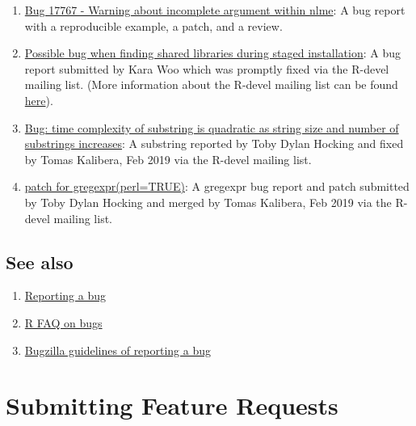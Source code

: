 \documentclass[
  letterpaper,
  DIV=11,
  numbers=noendperiod]{scrreprt}
\begin{document}
\begin{enumerate}
\def\labelenumi{\arabic{enumi}.}
\item
  \href{https://bugs.r-project.org/bugzilla/show_bug.cgi?id=17767}{Bug
  17767 - Warning about incomplete argument within nlme}: A bug report
  with a reproducible example, a patch, and a review.
\item
  \href{https://stat.ethz.ch/pipermail/r-devel/2019-May/077855.html}{Possible
  bug when finding shared libraries during staged installation}: A bug
  report submitted by Kara Woo which was promptly fixed via the R-devel
  mailing list. (More information about the R-devel mailing list can be
  found \href{https://stat.ethz.ch/mailman/listinfo/r-devel}{here}).
\item
  \href{https://stat.ethz.ch/pipermail/r-devel/2019-February/077393.html}{Bug:
  time complexity of substring is quadratic as string size and number of
  substrings increases}: A substring reported by Toby Dylan Hocking and
  fixed by Tomas Kalibera, Feb 2019 via the R-devel mailing list.
\item
  \href{https://stat.ethz.ch/pipermail/r-devel/2019-February/077315.html}{patch
  for gregexpr(perl=TRUE)}: A gregexpr bug report and patch submitted by
  Toby Dylan Hocking and merged by Tomas Kalibera, Feb 2019 via the
  R-devel mailing list.
\end{enumerate}

\section{See also}\label{see-also-1}

\begin{enumerate}
\def\labelenumi{\arabic{enumi}.}
\item
  \href{https://www.r-project.org/bugs.html}{Reporting a bug}
\item
  \href{https://mac.r-project.org/man/R-FAQ.html\#R-Bugs}{R FAQ on bugs}
\item
  \href{https://bugs.r-project.org/bugzilla/page.cgi?id=bug-writing.html}{Bugzilla
  guidelines of reporting a bug}
\end{enumerate}


\chapter{Submitting Feature Requests}\label{FeatureRequests}
\end{document}
